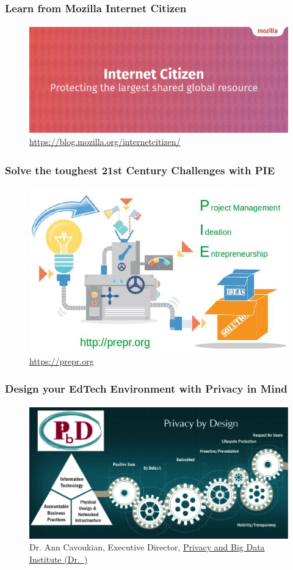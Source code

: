 	\begin{frame}
	\frametitle{Learn from Mozilla Internet Citizen}
	\framesubtitle{}
	        \begin{figure}[h]
                \centering
                \includegraphics[width=.8\textwidth]{../pics/moz-Internet-citizen}
		\caption{\url{https://blog.mozilla.org/internetcitizen/}}
        	\end{figure}
	\end{frame}

	\begin{frame}
	\frametitle{Solve the toughest 21st Century Challenges with PIE\tiny\textsuperscript{\textregistered}}
	\framesubtitle{}
	        \begin{figure}[h]
                \centering
                \includegraphics[width=.8\textwidth]{../pics/PIE_slide}
		\caption{\url{https://prepr.org}}
        	\end{figure}
	\end{frame}

	\begin{frame}
	\frametitle{Design your EdTech Environment with Privacy in Mind}
	\framesubtitle{}
	       	\begin{figure}[h]
               	\centering
               	\includegraphics[width=.8\textwidth]{../pics/privacybydesign}
		\caption{Dr. Ann Cavoukian, Executive Director, \href{http://www.ryerson.ca/pbdi/privacy-by-design/certification/TheSevenFoundationalPrinciplesofPrivacybyDesign/}{Privacy and Big Data Institute (Dr.~\cite{cavoukian2011})}}
        	\end{figure}
	\end{frame}

